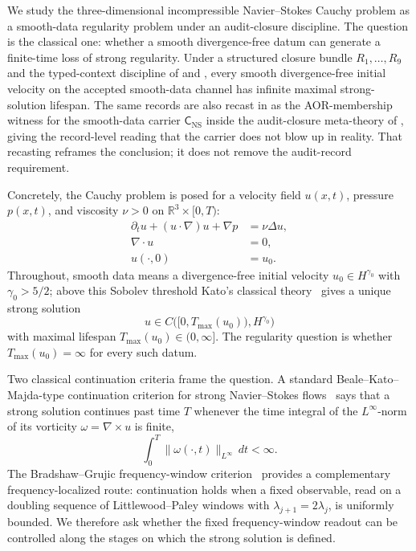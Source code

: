 \documentclass[11pt]{article}
\newcommand{\Tmax}{T_{\max}}
\theoremstyle{definition}
\begin{document}
We study the three-dimensional incompressible Navier--Stokes Cauchy
problem as a smooth-data regularity problem under an audit-closure
discipline.  The question is the classical one: whether a smooth
divergence-free datum can generate a finite-time loss of strong
regularity.  Under a structured closure bundle \(R_1,\ldots,R_9\) and
the typed-context discipline of \citet{Tsiokos2026XiCompanion} and
\citet{Tsiokos2026NeedleKiller}, every smooth divergence-free initial
velocity on the accepted smooth-data channel has infinite maximal
strong-solution lifespan.  The same records are also recast in
 as the AOR-membership witness for the
smooth-data carrier \(\mathsf C_{\mathrm{NS}}\) inside the
audit-closure meta-theory of \citet{Tsiokos2026AOR}, giving the
record-level reading that the carrier does not blow up in reality.
That recasting reframes the conclusion; it does not remove the
audit-record requirement.

Concretely, the Cauchy problem is posed for a velocity field \(u(x,t)\),
pressure \(p(x,t)\), and viscosity \(\nu>0\) on
\(\mathbb R^3\times[0,T)\):
\[
\begin{aligned}
  \partial_t u + (u\cdot\nabla)u + \nabla p &= \nu \Delta u,\\
  \nabla\cdot u &= 0,\\
  u(\cdot,0) &= u_0 .
\end{aligned}
\]
Throughout, smooth data means a divergence-free initial velocity
\(u_0\in H^{\gamma_0}\) with \(\gamma_0>5/2\); above this Sobolev
threshold Kato's classical theory~\citep{Kato1972} gives a unique
strong solution
\[
  u\in C\bigl([0,\Tmax(u_0)),H^{\gamma_0}\bigr)
\]
with maximal lifespan \(\Tmax(u_0)\in(0,\infty]\).  The regularity
question is whether \(\Tmax(u_0)=\infty\) for every such datum.

Two classical continuation criteria frame the question.  A standard
Beale--Kato--Majda-type continuation criterion for strong
Navier--Stokes flows~\citep{BealeKatoMajda1984,MajdaBertozzi2002,RobinsonRodrigoSadowski2016}
says that a strong solution continues past time \(T\) whenever the time
integral of the \(L^\infty\)-norm of its vorticity
\(\omega=\nabla\times u\) is finite,
\[
  \int_0^T \|\omega(\cdot,t)\|_{L^\infty}\,dt < \infty .
\]
The Bradshaw--Grujic frequency-window
criterion~\citep{BradshawGrujic2017} provides a complementary
frequency-localized route: continuation holds when a fixed observable,
read on a doubling sequence of Littlewood--Paley windows with
\(\lambda_{j+1}=2\lambda_j\), is uniformly bounded.  We therefore ask
whether the fixed frequency-window readout can be controlled along the
stages on which the strong solution is defined.
\end{document}
